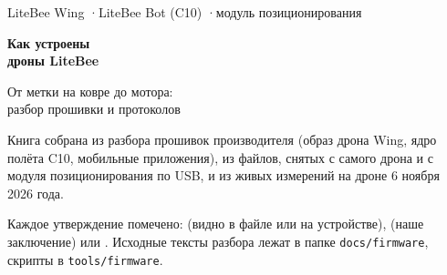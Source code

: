 \begin{titlepage}
  \thispagestyle{empty}
  \vspace*{3cm}
  {\sffamily\color{inkgray}\large LiteBee Wing \quad·\quad LiteBee Bot (C10) \quad·\quad модуль позиционирования\par}
  \vspace{1.2cm}
  {\sffamily\bfseries\color{accent}\fontsize{34}{40}\selectfont Как устроены\\дроны LiteBee\par}
  \vspace{0.8cm}
  {\sffamily\color{ink}\Large От метки на ковре до мотора:\\разбор прошивки и протоколов\par}
  \vspace{1.4cm}
  \vfill
  {\sffamily\color{inkgray}\small
  Книга собрана из разбора прошивок производителя (образ дрона Wing, ядро полёта C10, мобильные приложения), из файлов, снятых с самого дрона и с модуля позиционирования по USB, и из живых измерений на дроне 6 ноября 2026 года.\par
  \medskip
  Каждое утверждение помечено: \pr{} (видно в файле или на устройстве), \vyv{} (наше заключение) или \nei{}. Исходные тексты разбора лежат в папке \texttt{docs/firmware}, скрипты в \texttt{tools/firmware}.\par}
\end{titlepage}
